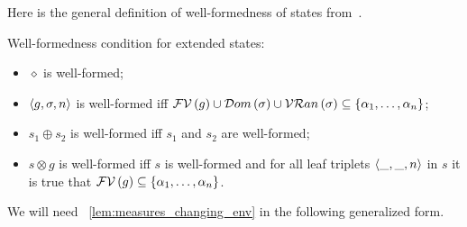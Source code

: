 Here is the general definition of well-formedness of states from~\cite{CertifiedSemantics}.

\begin{definition}
  Well-formedness condition for extended states:

  \begin{itemize}
  \item $\diamond$ is well-formed;
  \item $\left<{g, \sigma, n}\right>$ is well-formed iff $\mathcal{FV}\,({g})\cup\mathcal{D}om\,(\sigma)\cup\mathcal{VR}an\,(\sigma)\subseteq\{\alpha_1,\dots,\alpha_n\}$;
  \item $s_1\oplus s_2$ is well-formed iff $s_1$ and $s_2$ are well-formed;
  \item $s\otimes g$ is well-formed iff $s$ is well-formed and for all leaf triplets $\left<{\_,\_,n}\right>$ in $s$ it is true that $\mathcal{FV}\,({g})\subseteq\{\alpha_1,\dots,\alpha_n\}$.
  \end{itemize}

\end{definition}

We will need \lemmaword~\ref{lem:measures_changing_env} in the following generalized form.

